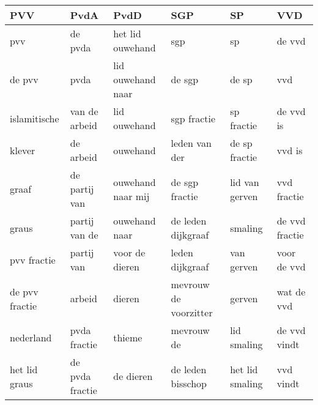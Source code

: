 \begin{tabular}{llllll}
\toprule
            PVV &             PvdA &               PvdD &                    SGP &               SP &             VVD \\
\midrule
            pvv &          de pvda &   het lid ouwehand &                    sgp &               sp &          de vvd \\
         de pvv &             pvda &  lid ouwehand naar &                 de sgp &            de sp &             vvd \\
   islamitische &    van de arbeid &       lid ouwehand &            sgp fractie &       sp fractie &       de vvd is \\
         klever &        de arbeid &           ouwehand &          leden van der &    de sp fractie &          vvd is \\
          graaf &    de partij van &  ouwehand naar mij &         de sgp fractie &   lid van gerven &     vvd fractie \\
          graus &    partij van de &      ouwehand naar &     de leden dijkgraaf &          smaling &  de vvd fractie \\
    pvv fractie &       partij van &     voor de dieren &        leden dijkgraaf &       van gerven &     voor de vvd \\
 de pvv fractie &           arbeid &             dieren &  mevrouw de voorzitter &           gerven &      wat de vvd \\
      nederland &     pvda fractie &             thieme &             mevrouw de &      lid smaling &    de vvd vindt \\
  het lid graus &  de pvda fractie &          de dieren &      de leden bisschop &  het lid smaling &       vvd vindt \\
\bottomrule
\end{tabular}
